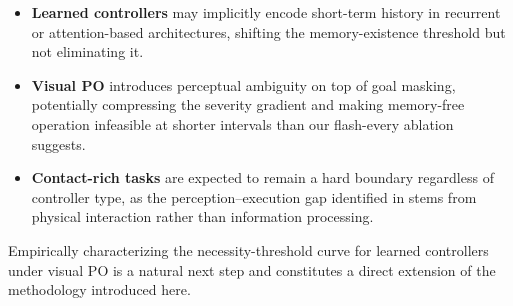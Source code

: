 \begin{itemize}
  \item \textbf{Learned controllers} may implicitly encode short-term history in recurrent or attention-based architectures, shifting the memory-existence threshold but not eliminating it.
  \item \textbf{Visual PO} introduces perceptual ambiguity on top of goal masking, potentially compressing the severity gradient and making memory-free operation infeasible at shorter intervals than our flash-every ablation suggests.
  \item \textbf{Contact-rich tasks} are expected to remain a hard boundary regardless of controller type, as the perception--execution gap identified in  stems from physical interaction rather than information processing.
\end{itemize}

Empirically characterizing the necessity-threshold curve for learned controllers under visual PO is a natural next step and constitutes a direct extension of the methodology introduced here.
